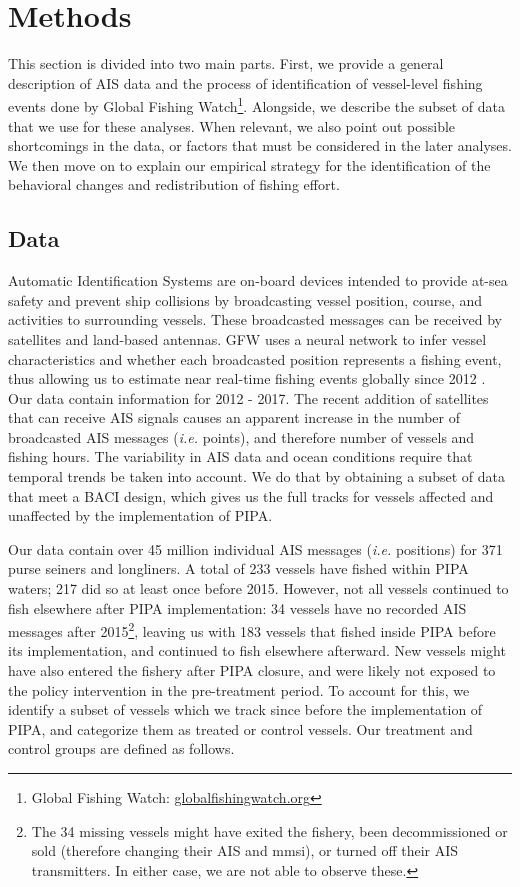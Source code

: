 \documentclass[12pt,]{article}
\let\rmarkdownfootnote\footnote%
\def\footnote{\protect\rmarkdownfootnote}
\begin{document}
\hypertarget{methods}{%
\section{Methods}\label{methods}}

This section is divided into two main parts. First, we provide a general
description of AIS data and the process of identification of
vessel-level fishing events done by Global Fishing Watch\footnote{Global
  Fishing Watch: \url{globalfishingwatch.org}}. Alongside, we describe
the subset of data that we use for these analyses. When relevant, we
also point out possible shortcomings in the data, or factors that must
be considered in the later analyses. We then move on to explain our
empirical strategy for the identification of the behavioral changes and
redistribution of fishing effort.

\hypertarget{data}{%
\subsection{Data}\label{data}}

Automatic Identification Systems are on-board devices intended to
provide at-sea safety and prevent ship collisions by broadcasting vessel
position, course, and activities to surrounding vessels. These
broadcasted messages can be received by satellites and land-based
antennas. GFW uses a neural network to infer vessel characteristics and
whether each broadcasted position represents a fishing event, thus
allowing us to estimate near real-time fishing events globally since
2012 \citep{kroodsma_2018}. Our data contain information for 2012 -
2017. The recent addition of satellites that can receive AIS signals
causes an apparent increase in the number of broadcasted AIS messages
(\emph{i.e.} points), and therefore number of vessels and fishing hours.
The variability in AIS data and ocean conditions require that temporal
trends be taken into account. We do that by obtaining a subset of data
that meet a BACI design, which gives us the full tracks for vessels
affected and unaffected by the implementation of PIPA.

Our data contain over 45 million individual AIS messages (\emph{i.e.}
positions) for 371 purse seiners and longliners. A total of 233 vessels
have fished within PIPA waters; 217 did so at least once before 2015.
However, not all vessels continued to fish elsewhere after PIPA
implementation: 34 vessels have no recorded AIS messages after
2015\footnote{The 34 missing vessels might have exited the fishery, been
  decommissioned or sold (therefore changing their AIS and mmsi), or
  turned off their AIS transmitters. In either case, we are not able to
  observe these.}, leaving us with 183 vessels that fished inside PIPA
before its implementation, and continued to fish elsewhere afterward.
New vessels might have also entered the fishery after PIPA closure, and
were likely not exposed to the policy intervention in the pre-treatment
period. To account for this, we identify a subset of vessels which we
track since before the implementation of PIPA, and categorize them as
treated or control vessels. Our treatment and control groups are defined
as follows.
\end{document}
